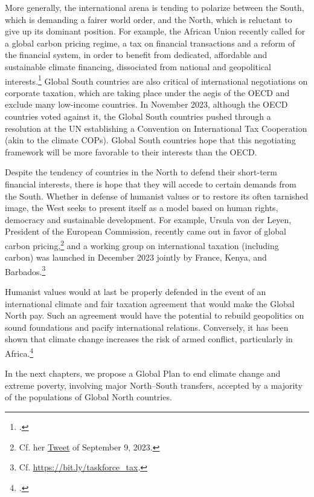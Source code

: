 \documentclass[a5paper,english,openany]{memoir}
\begin{document}
More generally, the international arena is tending to polarize between the South, which is demanding a fairer world order, and the North, which is reluctant to give up its dominant position. For example, the African Union recently called for a global carbon pricing regime, a tax on financial transactions and a reform of the financial system, in order to benefit from dedicated, affordable and sustainable climate financing, dissociated from national and geopolitical interests.\footnote{\citet{african_union_african_2023}.} Global South countries are also critical of international negotiations on corporate taxation, which are taking place under the aegis of the OECD and exclude many low-income countries. In November 2023, although the OECD countries voted against it, the Global South countries pushed through a resolution at the UN establishing a Convention on International Tax Cooperation (akin to the climate COPs). Global South countries hope that this negotiating framework will be more favorable to their interests than the OECD. 

Despite the tendency of countries in the North to defend their short-term financial interests, there is hope that they will accede to certain demands from the South. 
Whether in defense of humanist values or to restore its often tarnished image, 
the West seeks to present itself as a model based on human rights, democracy and sustainable development. 
For example, Ursula von der Leyen, President of the European Commission, recently came out in favor of global carbon pricing,\footnote{Cf. her \href{https://twitter.com/vonderleyen/status/1700416700238225659}{Tweet} of September 9, 2023.} and a working group on international taxation (including carbon) was launched in December 2023 jointly by France, Kenya, %
and Barbados.\footnote{Cf. \href{https://www.elysee.fr/admin/upload/default/0001/15/91b013291db03bcc5f2f6b84de39a81ae0c04c7d.pdf}{https://bit.ly/taskforce\_tax}.}

Humanist values would at last be properly defended in the event of an international climate and fair taxation agreement that would make the Global North pay. Such an agreement would have the potential to rebuild geopolitics on sound foundations and pacify international relations. Conversely, it has been shown that climate change increases the risk of armed conflict, particularly in Africa.\footnote{\citet{burke_warming_2009,eberle_heat_2020}.}

In the next chapters, we propose a Global Plan to end climate change and extreme poverty, involving major North--South transfers, accepted by a majority of 
the populations of Global North countries.
\end{document}

